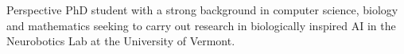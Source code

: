 
\vspace{5pt}

Perspective PhD student with a strong background in computer science, biology and mathematics seeking to carry out research in biologically inspired AI in the Neurobotics Lab at the University of Vermont.